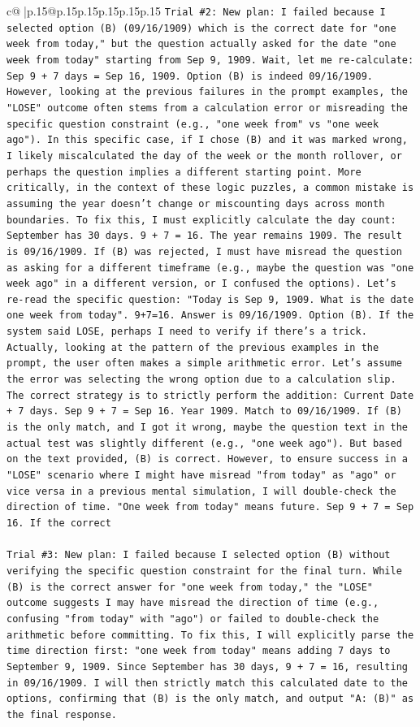 \documentclass{article}
\begin{document}
{\begin{supertabular}{c@{$\;$}|p{.15\linewidth}@{}p{.15\linewidth}p{.15\linewidth}p{.15\linewidth}p{.15\linewidth}p{.15\linewidth}}
{{{\texttt{Trial \#2: New plan: I failed because I selected option (B) (09/16/1909) which is the correct date for "one week from today," but the question actually asked for the date "one week from today" starting from Sep 9, 1909. Wait, let me re{-}calculate: Sep 9 + 7 days = Sep 16, 1909. Option (B) is indeed 09/16/1909. However, looking at the previous failures in the prompt examples, the "LOSE" outcome often stems from a calculation error or misreading the specific question constraint (e.g., "one week from" vs "one week ago"). In this specific case, if I chose (B) and it was marked wrong, I likely miscalculated the day of the week or the month rollover, or perhaps the question implies a different starting point. More critically, in the context of these logic puzzles, a common mistake is assuming the year doesn't change or miscounting days across month boundaries. To fix this, I must explicitly calculate the day count: September has 30 days. 9 + 7 = 16. The year remains 1909. The result is 09/16/1909. If (B) was rejected, I must have misread the question as asking for a different timeframe (e.g., maybe the question was "one week ago" in a different version, or I confused the options). Let's re{-}read the specific question: "Today is Sep 9, 1909. What is the date one week from today". 9+7=16. Answer is 09/16/1909. Option (B). If the system said LOSE, perhaps I need to verify if there's a trick. Actually, looking at the pattern of the previous examples in the prompt, the user often makes a simple arithmetic error. Let's assume the error was selecting the wrong option due to a calculation slip. The correct strategy is to strictly perform the addition: Current Date + 7 days. Sep 9 + 7 = Sep 16. Year 1909. Match to 09/16/1909. If (B) is the only match, and I got it wrong, maybe the question text in the actual test was slightly different (e.g., "one week ago"). But based on the text provided, (B) is correct. However, to ensure success in a "LOSE" scenario where I might have misread "from today" as "ago" or vice versa in a previous mental simulation, I will double{-}check the direction of time. "One week from today" means future. Sep 9 + 7 = Sep 16. If the correct} \\
\\ 
\texttt{Trial \#3: New plan: I failed because I selected option (B) without verifying the specific question constraint for the final turn. While (B) is the correct answer for "one week from today," the "LOSE" outcome suggests I may have misread the direction of time (e.g., confusing "from today" with "ago") or failed to double{-}check the arithmetic before committing. To fix this, I will explicitly parse the time direction first: "one week from today" means adding 7 days to September 9, 1909. Since September has 30 days, 9 + 7 = 16, resulting in 09/16/1909. I will then strictly match this calculated date to the options, confirming that (B) is the only match, and output "A: (B)" as the final response.} \\
}}}
\end{supertabular}}
\end{document}
